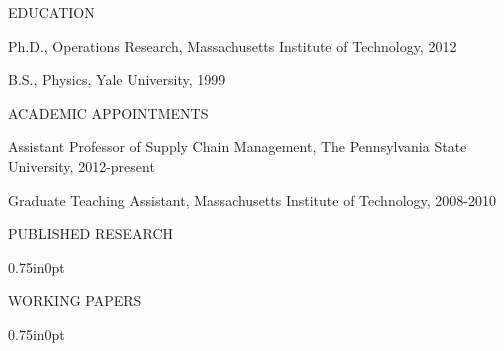 \documentclass[letterpaper,11pt,oneside]{article}
\newcommand\myIndent{0.75in}
\newcommand\myHangIndent{1in}
\newcommand\mySpaceBeforeSection{0.9em}
\newcommand\myNegSpaceCorrectBib{-4.25em}
\newcommand\mySpaceBeforeSectionAfterBib{0em}
\newcommand{\NiceIndent}{ \parindent=\myIndent \hangindent=\myHangIndent }
\begin{document}
\vspace{\mySpaceBeforeSection}



\noindent EDUCATION

\NiceIndent Ph.D., Operations Research, Massachusetts Institute of Technology, 2012

\NiceIndent B.S., Physics, Yale University, 1999


\vspace{\mySpaceBeforeSection}


\noindent ACADEMIC APPOINTMENTS

\NiceIndent Assistant Professor of Supply Chain Management, The Pennsylvania State University, 2012-present 

\NiceIndent Graduate Teaching Assistant, Massachusetts Institute of Technology, 2008-2010



\vspace{\mySpaceBeforeSection}
\noindent PUBLISHED RESEARCH
\vspace{\myNegSpaceCorrectBib}
\begin{bibunit}

    \begin{adjustwidth}{\myIndent}{0pt}
        \nocite{fearing_how_2011}
        \nocite{acimovic_making_2015}
        \nocite{acimovic_models_2016}
        \nocite{grober_fundamental_2000}
        \nocite{acimovic_mitigating_2016}
        \putbib
    \end{adjustwidth}
\end{bibunit}

\vspace{\mySpaceBeforeSectionAfterBib}
\noindent WORKING PAPERS 
\vspace{\myNegSpaceCorrectBib}
\begin{bibunit}
    \begin{adjustwidth}{\myIndent}{0pt}
    
        
        
        \nocite{hu_forecasting_2016}
        \putbib
    \end{adjustwidth}
\end{bibunit}
\end{document}
